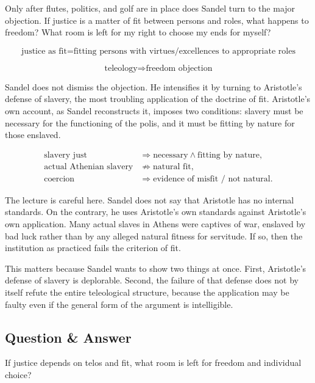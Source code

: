 Only after flutes, politics, and golf are in place does Sandel turn to the major objection. If justice is a matter of fit between persons and roles, what happens to freedom? What room is left for my right to choose my ends for myself?

\begin{equation}
\text{justice as fit}
=
\text{fitting persons with virtues/excellences to appropriate roles}
\end{equation}

\begin{equation}
\text{teleology}
\Longrightarrow
\text{freedom objection}
\end{equation}

Sandel does not dismiss the objection. He intensifies it by turning to Aristotle's defense of slavery, the most troubling application of the doctrine of fit. Aristotle's own account, as Sandel reconstructs it, imposes two conditions: slavery must be necessary for the functioning of the polis, and it must be fitting by nature for those enslaved.

\begin{align}
\text{slavery just}
&\Longrightarrow
\text{necessary} \land \text{fitting by nature},\\
\text{actual Athenian slavery}
&\not\Longrightarrow
\text{natural fit},\\
\text{coercion}
&\Longrightarrow
\text{evidence of misfit / not natural}.
\end{align}

The lecture is careful here. Sandel does not say that Aristotle has no internal standards. On the contrary, he uses Aristotle's own standards against Aristotle's own application. Many actual slaves in Athens were captives of war, enslaved by bad luck rather than by any alleged natural fitness for servitude. If so, then the institution as practiced fails the criterion of fit.

This matters because Sandel wants to show two things at once. First, Aristotle's defense of slavery is deplorable. Second, the failure of that defense does not by itself refute the entire teleological structure, because the application may be faulty even if the general form of the argument is intelligible.

\subsection{Question \& Answer}

If justice depends on telos and fit, what room is left for freedom and individual choice?

